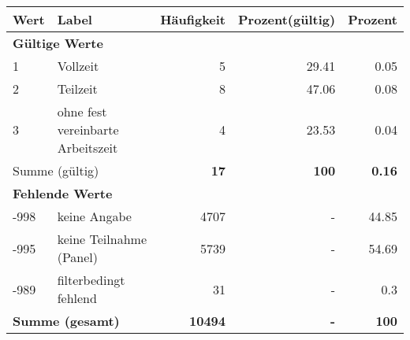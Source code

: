      \begin{longtable}{lXrrr}
     \toprule
     \textbf{Wert} & \textbf{Label} & \textbf{Häufigkeit} & \textbf{Prozent(gültig)} & \textbf{Prozent} \\
     \endhead
     \midrule
     \multicolumn{5}{l}{\textbf{Gültige Werte}}\\

     1 &
     \multicolumn{1}{X}{ Vollzeit   } &


       \num{5} &
       \num[round-mode=places,round-precision=2]{29,41} &
         \num[round-mode=places,round-precision=2]{0,05} \\

     2 &
     \multicolumn{1}{X}{ Teilzeit   } &


       \num{8} &
       \num[round-mode=places,round-precision=2]{47,06} &
         \num[round-mode=places,round-precision=2]{0,08} \\

     3 &
     \multicolumn{1}{X}{ ohne fest vereinbarte Arbeitszeit   } &


       \num{4} &
       \num[round-mode=places,round-precision=2]{23,53} &
         \num[round-mode=places,round-precision=2]{0,04} \\
     \midrule
     \multicolumn{2}{l}{Summe (gültig)} &
       \textbf{\num{17}} &
     \textbf{100} &
       \textbf{\num[round-mode=places,round-precision=2]{0,16}} \\
     \multicolumn{5}{l}{\textbf{Fehlende Werte}}\\
       -998 &
       keine Angabe &
         \num{4707} &
        - &
         \num[round-mode=places,round-precision=2]{44,85} \\
       -995 &
       keine Teilnahme (Panel) &
         \num{5739} &
        - &
         \num[round-mode=places,round-precision=2]{54,69} \\
       -989 &
       filterbedingt fehlend &
         \num{31} &
        - &
         \num[round-mode=places,round-precision=2]{0,3} \\
     \midrule
     \multicolumn{2}{l}{\textbf{Summe (gesamt)}} &
          \textbf{\num{10494}} &
        \textbf{-} &
        \textbf{100} \\
     \bottomrule
     \end{longtable}
     
